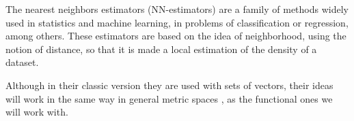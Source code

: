 The nearest neighbors estimators (NN-estimators) are a family of methods widely
used in statistics and machine learning, in problems of classification or
regression, among others. These estimators are based on the idea of
neighborhood, using the notion of distance, so that it is made a local
estimation of the density of a dataset.

Although in their classic version they are used with sets of vectors,
their ideas will work in the same way in general metric
spaces \cite{baillo2010}, as the functional ones we will work with.
